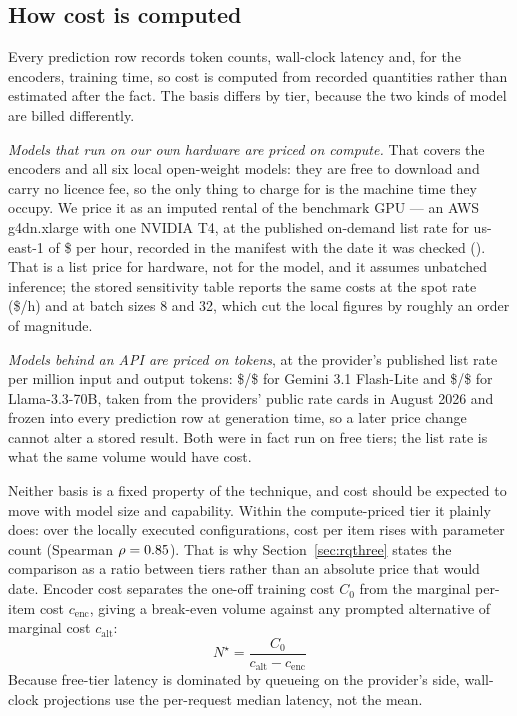 \documentclass[conference]{IEEEtran}
\begin{document}
\subsection{How cost is computed}
\label{sec:cost}
Every prediction row records token counts, wall-clock latency and, for the
encoders, training time, so cost is computed from recorded quantities rather than
estimated after the fact. The basis differs by tier, because the two kinds of
model are billed differently.

\emph{Models that run on our own hardware are priced on compute.} That covers the
encoders and all six local open-weight models: they are free to download and
carry no licence fee, so the only thing to charge for is the machine time they
occupy. We price it as an imputed rental of the benchmark GPU --- an AWS
g4dn.xlarge with one NVIDIA T4, at the published on-demand list rate for
us-east-1 of \$\nGpuOnDemand{} per hour, recorded in the manifest with the date
it was checked (\nGpuSource). That is a list price for hardware, not for the
model, and it assumes unbatched inference; the stored sensitivity table reports
the same costs at the spot rate (\$\nGpuSpot/h) and at batch sizes 8 and 32,
which cut the local figures by roughly an order of magnitude.

\emph{Models behind an API are priced on tokens}, at the provider's published
list rate per million input and output tokens: \$\nPriceGemIn/\$\nPriceGemOut{}
for Gemini 3.1 Flash-Lite and \$\nPriceLlaIn/\$\nPriceLlaOut{} for
Llama-3.3-70B, taken from the providers' public rate cards in August 2026 and
frozen into every prediction row at generation time, so a later price change
cannot alter a stored result. Both were in fact run on free tiers; the list rate
is what the same volume would have cost.

Neither basis is a fixed property of the technique, and cost should be expected
to move with model size and capability. Within the compute-priced tier it plainly
does: over the \nNlocalCfg{} locally executed configurations, cost per item rises
with parameter count (Spearman $\rho = 0.85$). That is why
Section~\ref{sec:rqthree} states the comparison as a ratio between tiers rather
than an absolute price that would date. Encoder cost separates the one-off
training cost $C_0$ from the marginal per-item cost $c_\text{enc}$, giving a
break-even volume against any prompted alternative of marginal cost
$c_\text{alt}$:
\begin{equation}
N^{\star} = \frac{C_0}{c_\text{alt} - c_\text{enc}}
\label{eq:breakeven}
\end{equation}
Because free-tier latency is dominated by queueing on the provider's side,
wall-clock projections use the per-request median latency, not the mean.
\end{document}
